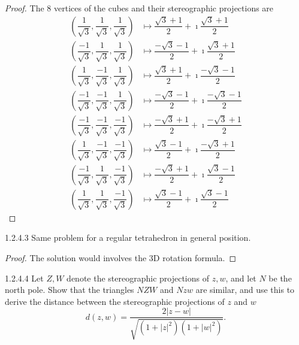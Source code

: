 \begin{proof}
	The 8 vertices of the cubes and their stereographic projections are
	\begingroup
	\allowdisplaybreaks%
	\begin{align*}
		\left( \dfrac{1}{\sqrt{3}}, \dfrac{1}{\sqrt{3}}, \dfrac{1}{\sqrt{3}} \right)    & \longmapsto \dfrac{\sqrt{3} + 1}{2} + \imath\dfrac{\sqrt{3} + 1}{2}   \\
		\left( \dfrac{-1}{\sqrt{3}}, \dfrac{1}{\sqrt{3}}, \dfrac{1}{\sqrt{3}} \right)   & \longmapsto \dfrac{-\sqrt{3} - 1}{2} + \imath\dfrac{\sqrt{3} + 1}{2}  \\
		\left( \dfrac{1}{\sqrt{3}}, \dfrac{-1}{\sqrt{3}}, \dfrac{1}{\sqrt{3}} \right)   & \longmapsto \dfrac{\sqrt{3} + 1}{2} + \imath\dfrac{-\sqrt{3} - 1}{2}  \\
		\left( \dfrac{-1}{\sqrt{3}}, \dfrac{-1}{\sqrt{3}}, \dfrac{1}{\sqrt{3}} \right)  & \longmapsto \dfrac{-\sqrt{3} - 1}{2} + \imath\dfrac{-\sqrt{3} - 1}{2} \\
		\left( \dfrac{-1}{\sqrt{3}}, \dfrac{-1}{\sqrt{3}}, \dfrac{-1}{\sqrt{3}} \right) & \longmapsto \dfrac{-\sqrt{3} + 1}{2} + \imath\dfrac{-\sqrt{3} + 1}{2} \\
		\left( \dfrac{1}{\sqrt{3}}, \dfrac{-1}{\sqrt{3}}, \dfrac{-1}{\sqrt{3}} \right)  & \longmapsto \dfrac{\sqrt{3} - 1}{2} + \imath\dfrac{-\sqrt{3} + 1}{2}  \\
		\left( \dfrac{-1}{\sqrt{3}}, \dfrac{1}{\sqrt{3}}, \dfrac{-1}{\sqrt{3}} \right)  & \longmapsto \dfrac{-\sqrt{3} + 1}{2} + \imath\dfrac{\sqrt{3} - 1}{2}  \\
		\left( \dfrac{1}{\sqrt{3}}, \dfrac{1}{\sqrt{3}}, \dfrac{-1}{\sqrt{3}} \right)   & \longmapsto \dfrac{\sqrt{3} - 1}{2} + \imath\dfrac{\sqrt{3} - 1}{2}
	\end{align*}
	\endgroup
\end{proof}

\begin{problem}{1.2.4.3}
Same problem for a regular tetrahedron in general position.
\end{problem}

\begin{proof}
	The solution would involves the 3D rotation formula.
\end{proof}

\begin{problem}{1.2.4.4}
Let \( Z, W \) denote the stereographic projections of \( z, w \), and let \( N \) be the north pole. Show that the triangles \( NZW \) and \( Nzw \) are similar, and use this to derive the distance between the stereographic projections of \( z  \) and \( w \)
\[
	d(z, w) = \dfrac{2\left\vert z - w\right\vert}{\sqrt{\left(1 + {\left\vert z \right\vert}^{2}\right)\left(1 + {\left\vert w \right\vert}^{2}\right)}}.
\]
\end{problem}

